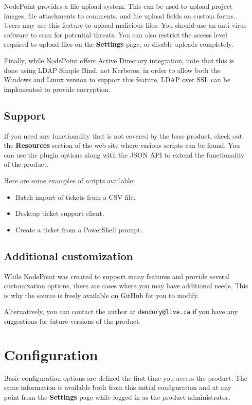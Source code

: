 \documentclass[11pt]{article}
\begin{document}
NodePoint provides a file upload system. This can be used to upload project images, file attachments to comments, and file upload fields on custom forms. Users may use this feature to upload malicious files. You should use an anti-virus software to scan for potential threats. You can also restrict the access level required to upload files on the \textbf{Settings} page, or disable uploads completely.

Finally, while NodePoint offers Active Directory integration, note that this is done using LDAP Simple Bind, not Kerberos, in order to allow both the Windows and Linux version to support this feature. LDAP over SSL can be implemented to provide encryption.

\subsection{Support}
If you need any functionality that is not covered by the base product, check out the \textbf{Resources} section of the web site where various scripts can be found. You can use the plugin options along with the JSON API to extend the functionality of the product.

Here are some examples of scripts available:

\begin{itemize}
\item Batch import of tickets from a CSV file.
\item Desktop ticket support client.
\item Create a ticket from a PowerShell prompt.
\end{itemize}

\subsection{Additional customization}

While NodePoint was created to support many features and provide several customization options, there are cases where you may have additional needs. This is why the source is freely available on GitHub for you to modify.

Alternatively, you can contact the author at \texttt{dendory@live.ca} if you have any suggestions for future versions of the product.

\clearpage
\section{Configuration}
Basic configuration options are defined the first time you access the product. The same information is available both from this initial configuration and at any point from the \textbf{Settings} page while logged in as the product administrator.
\end{document}
